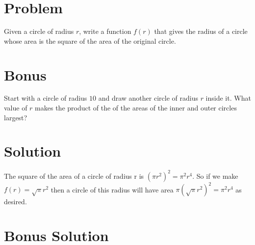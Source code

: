 \documentclass[11pt,a4paper]{report}
\theoremstyle{plain}
\theoremstyle{definition}
\theoremstyle{remark}
\begin{document}
\section*{Problem} Given a circle of radius $r$, write a function $f(r)$ that
gives the radius of a circle whose area is the square of the area of the
original circle.

\section*{Bonus} Start with a circle of radius $10$ and draw another circle of
radius $r$ inside it.  What value of $r$ makes the product of the of the areas
of the inner and outer circles largest?

\section*{Solution} The square of the area of a circle of radius r is
$( \pi r^2)^2 = \pi^2r^4$.   So if we make $f(r) = \sqrt{\pi}r^2$ then a circle
of this radius will have area $\pi ( \sqrt{\pi}r^2)^2 = \pi^2r^4$ as desired.

\section*{Bonus Solution}
 
 
\end{document}
